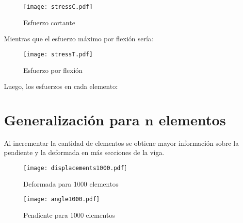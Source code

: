 \documentclass[11pt,a4paper]{article}
\begin{document}
\begin{figure}[H]
    \centering
    \texttt{[image: stressC.pdf]}
    \caption{Esfuerzo cortante}
\end{figure}
Mientras que el esfuerzo máximo por flexión sería:
\begin{figure}[H]
    \centering
    \texttt{[image: stressT.pdf]}
    \caption{Esfuerzo por flexión}
\end{figure}
Luego, los esfuerzos en cada elemento:
\begin{table}[H]
    \centering
    \caption{Esfuerzos en la viga}
\end{table}
\section{Generalización para $\mathbf{n}$ elementos}
Al incrementar la cantidad de elementos se obtiene mayor información sobre la pendiente y la deformada en más secciones de la viga.
\begin{figure}[H]
    \centering
    \texttt{[image: displacements1000.pdf]}
    \caption{Deformada para 1000 elementos}
\end{figure}
\begin{figure}[H]
    \centering
    \texttt{[image: angle1000.pdf]}
    \caption{Pendiente para 1000 elementos}
\end{figure}
\end{document}
